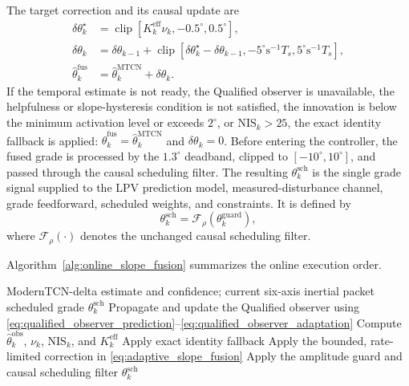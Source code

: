 \documentclass{ieeeaccess}
\begin{document}
The target correction and its causal update are
\begin{align}
\delta\theta_k^{\star}
&=\operatorname{clip}\!\left[
K_k^{\mathrm{eff}}\nu_k,-0.5^{\circ},0.5^{\circ}\right],\nonumber\\
\delta\theta_k
&=\delta\theta_{k-1}
+\operatorname{clip}\!\left[
\delta\theta_k^{\star}-\delta\theta_{k-1},
-5^{\circ}\mathrm{s}^{-1}T_s,5^{\circ}\mathrm{s}^{-1}T_s\right],\nonumber\\
\hat\theta_k^{\mathrm{fus}}
&=\hat\theta_k^{\mathrm{MTCN}}+\delta\theta_k .
\label{eq:adaptive_slope_fusion}
\end{align}
If the temporal estimate is not ready, the Qualified observer is unavailable,
the helpfulness or slope-hysteresis condition is not satisfied, the innovation
is below the minimum activation level or exceeds $2^{\circ}$, or
$\mathrm{NIS}_k>25$, the exact identity fallback is applied:
$\hat\theta_k^{\mathrm{fus}}=\hat\theta_k^{\mathrm{MTCN}}$ and
$\delta\theta_k=0$. Before entering the controller, the fused grade is
processed by the $1.3^{\circ}$ deadband, clipped to
$[-10^{\circ},10^{\circ}]$, and passed through the causal scheduling filter.
The resulting $\theta_k^{\mathrm{sch}}$ is the single grade signal supplied to
the LPV prediction model, measured-disturbance channel, grade feedforward,
scheduled weights, and constraints. It is defined by
\begin{equation}
\theta_k^{\mathrm{sch}}=\mathcal F_{\rho}\!\left(\theta_k^{\mathrm{guard}}\right),
\label{eq:fused_slope_conditioning}
\end{equation}
where $\mathcal F_{\rho}(\cdot)$ denotes the unchanged causal scheduling
filter.

Algorithm~\ref{alg:online_slope_fusion} summarizes the online execution order.
\begin{algorithm}[!t]
\caption{Online grade fusion assisted by the Qualified observer}
\label{alg:online_slope_fusion}
\begin{algorithmic}[1]
\Require ModernTCN-delta estimate and confidence; current six-axis inertial packet
\Ensure scheduled grade $\theta_k^{\mathrm{sch}}$
\State Propagate and update the Qualified observer using
\eqref{eq:qualified_observer_prediction}--\eqref{eq:qualified_observer_adaptation}
\State Compute $\hat\theta_k^{\mathrm{obs}}$, $\nu_k$, $\mathrm{NIS}_k$, and
$K_k^{\mathrm{eff}}$
    \State Apply exact identity fallback
\Else
    \State Apply the bounded, rate-limited correction in
    \eqref{eq:adaptive_slope_fusion}
\EndIf
\State Apply the amplitude guard and causal scheduling filter
\State \Return $\theta_k^{\mathrm{sch}}$
\end{algorithmic}
\end{algorithm}
\end{document}
